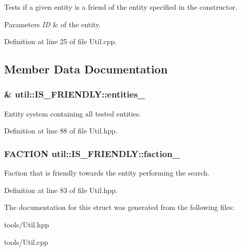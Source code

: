 Tests if a given entity is a friend of the entity specified in the constructor. 


\begin{DoxyParams}{Parameters}
{\em ID} & of the entity. \\
\hline
\end{DoxyParams}


Definition at line 25 of file Util.\+cpp.



\subsection{Member Data Documentation}
\subsubsection[{\texorpdfstring{entities\+\_\+}{entities_}}]{\& util\+::\+I\+S\+\_\+\+F\+R\+I\+E\+N\+D\+L\+Y\+::entities\+\_\+\hspace{0.3cm}{\ttfamily [private]}}\hypertarget{structutil_1_1_i_s___f_r_i_e_n_d_l_y_a9a19200cb9d0f2617fcc09208fd18695}{}\label{structutil_1_1_i_s___f_r_i_e_n_d_l_y_a9a19200cb9d0f2617fcc09208fd18695}


Entity system containing all tested entities. 



Definition at line 88 of file Util.\+hpp.

\subsubsection[{\texorpdfstring{faction\+\_\+}{faction_}}]{\setlength{\rightskip}{0pt plus 5cm}F\+A\+C\+T\+I\+ON util\+::\+I\+S\+\_\+\+F\+R\+I\+E\+N\+D\+L\+Y\+::faction\+\_\+\hspace{0.3cm}{\ttfamily [private]}}\hypertarget{structutil_1_1_i_s___f_r_i_e_n_d_l_y_a72357a222144da459f16abecc4d528d5}{}\label{structutil_1_1_i_s___f_r_i_e_n_d_l_y_a72357a222144da459f16abecc4d528d5}


Faction that is friendly towards the entity performing the search. 



Definition at line 83 of file Util.\+hpp.



The documentation for this struct was generated from the following files\+:\begin{DoxyCompactItemize}
\item 
tools/Util.\+hpp\item 
tools/Util.\+cpp\end{DoxyCompactItemize}
